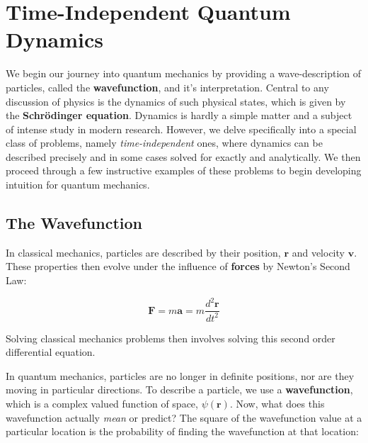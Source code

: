 
\setchapterpreamble[u]{\margintoc}
\chapter{Time-Independent Quantum Dynamics}

We begin our journey into quantum mechanics by providing a wave-description of particles, called the \textbf{wavefunction}, and it's interpretation. Central to any discussion of physics is the dynamics of such physical states, which is given by the \textbf{Schr\"{o}dinger equation}. Dynamics is hardly a simple matter and a subject of intense study in modern research. However, we delve specifically into a special class of problems, namely \textit{time-independent} ones, where dynamics can be described precisely and in some cases solved for exactly and analytically. We then proceed through a few instructive examples of these problems to begin developing intuition for quantum mechanics. 

\section{The Wavefunction}

In classical mechanics, particles are described by their position, $\mathbf{r} $ and velocity $\mathbf{v}$. These properties then evolve under the influence of \textbf{forces} by Newton's Second Law:

\begin{equation}
	\mathbf{F} = m\mathbf{a} = m\frac{d^2 \mathbf{r}}{dt^2}
\end{equation}

Solving classical mechanics problems then involves solving this second order differential equation. 

In quantum mechanics, particles are no longer in definite positions, nor are they moving in particular directions. To describe a particle, we use a \textbf{wavefunction}, which is a complex valued function of space, $\psi(\mathbf{r})$. Now, what does this wavefunction actually \textit{mean} or predict? The square of the wavefunction value at a particular location is the probability of finding the wavefunction at that location:

